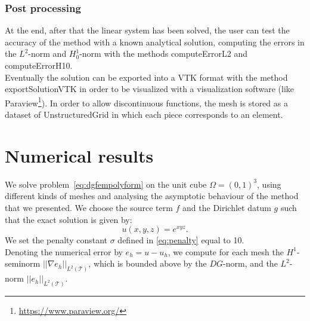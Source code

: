 \documentclass[12pt, a4paper]{article}
\newcommand{\code}[1]{{\footnotesize\ttfamily #1}}
\theoremstyle{definition}
\theoremstyle{plain}
\theoremstyle{plain}
\theoremstyle{definition}
\begin{document}
\subsubsection{Post processing}
At the end, after that the linear system has been solved, the user can test the 
accuracy of the method with a known analytical solution, computing the errors 
in the $L^2$-norm and $H^1_0$-norm with the methods \code{computeErrorL2} and 
\code{computeErrorH10}.\\
Eventually the solution can be exported into a VTK format with the method 
\code{exportSolutionVTK} in order to be visualized with a visualization 
software (like Paraview\footnote{\url{https://www.paraview.org/}}). In order to 
allow discontinuous functions, the mesh is stored as a dataset of 
\code{UnstructuredGrid} in which each piece corresponds to an element.
\section{Numerical results}\label{sec:res}
We solve problem~\eqref{eq:dgfempolyform} on the unit cube $\Omega = (0,1)^3$, 
using different kinds of meshes and analysing the asymptotic behaviour of the 
method that we presented. We choose the source term $f$ and the Dirichlet datum 
$g$ such that the exact solution is given by:
\begin{equation*}
	u(x,y,z) = e^{xyz}.
\end{equation*}
We set the penalty constant $\sigma$ defined in \eqref{eq:penalty} equal to 10.\\
Denoting the numerical error by $e_h= u - u_h$, we compute for each mesh the 
$H^1$-seminorm $|\!| \nabla e_h |\!|_{L^2(\mathcal{T})}$, which is bounded 
above by the $DG$-norm, and the $L^2$-norm $|\!|e_h|\!|_{L^2(\mathcal{T})}$.
\end{document}

